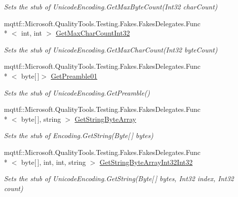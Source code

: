 \begin{DoxyCompactItemize}
\begin{DoxyCompactList}\small\item\em Sets the stub of Unicode\-Encoding.\-Get\-Max\-Byte\-Count(\-Int32 char\-Count)\end{DoxyCompactList}\item 
mqttf\-::\-Microsoft.\-Quality\-Tools.\-Testing.\-Fakes.\-Fakes\-Delegates.\-Func\\*
$<$ int, int $>$ \hyperlink{class_system_1_1_text_1_1_fakes_1_1_stub_unicode_encoding_aaa2da8c382d0aa33e1a997f162b9ccd5}{Get\-Max\-Char\-Count\-Int32}
\begin{DoxyCompactList}\small\item\em Sets the stub of Unicode\-Encoding.\-Get\-Max\-Char\-Count(\-Int32 byte\-Count)\end{DoxyCompactList}\item 
mqttf\-::\-Microsoft.\-Quality\-Tools.\-Testing.\-Fakes.\-Fakes\-Delegates.\-Func\\*
$<$ byte\mbox{[}$\,$\mbox{]}$>$ \hyperlink{class_system_1_1_text_1_1_fakes_1_1_stub_unicode_encoding_a0e709a50a181f6bffa95fee2ffc50e9b}{Get\-Preamble01}
\begin{DoxyCompactList}\small\item\em Sets the stub of Unicode\-Encoding.\-Get\-Preamble()\end{DoxyCompactList}\item 
mqttf\-::\-Microsoft.\-Quality\-Tools.\-Testing.\-Fakes.\-Fakes\-Delegates.\-Func\\*
$<$ byte\mbox{[}$\,$\mbox{]}, string $>$ \hyperlink{class_system_1_1_text_1_1_fakes_1_1_stub_unicode_encoding_a58ddbf701af7a1905cf829a33402fbfe}{Get\-String\-Byte\-Array}
\begin{DoxyCompactList}\small\item\em Sets the stub of Encoding.\-Get\-String(\-Byte\mbox{[}$\,$\mbox{]} bytes)\end{DoxyCompactList}\item 
mqttf\-::\-Microsoft.\-Quality\-Tools.\-Testing.\-Fakes.\-Fakes\-Delegates.\-Func\\*
$<$ byte\mbox{[}$\,$\mbox{]}, int, int, string $>$ \hyperlink{class_system_1_1_text_1_1_fakes_1_1_stub_unicode_encoding_a6cb7579defd1da396857f4a397d56e02}{Get\-String\-Byte\-Array\-Int32\-Int32}
\begin{DoxyCompactList}\small\item\em Sets the stub of Unicode\-Encoding.\-Get\-String(\-Byte\mbox{[}$\,$\mbox{]} bytes, Int32 index, Int32 count)\end{DoxyCompactList}\item 

\end{DoxyCompactItemize}

